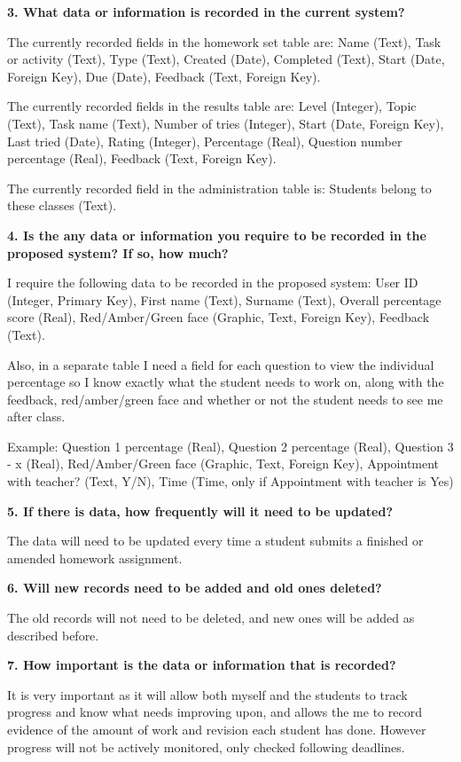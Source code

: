\textbf{3. What data or information is recorded in the current system?}

The currently recorded fields in the homework set table are: Name (Text), Task or activity (Text), Type (Text), Created (Date), Completed (Text), Start (Date, Foreign Key), Due (Date), Feedback (Text, Foreign Key).

The currently recorded fields in the results table are: Level (Integer), Topic (Text), Task name (Text), Number of tries (Integer), Start (Date, Foreign Key), Last tried (Date), Rating (Integer), Percentage (Real), Question number percentage (Real), Feedback (Text, Foreign Key).

The currently recorded field in the administration table is: Students belong to these classes (Text).

\textbf{4. Is the any data or information you require to be recorded in the proposed system? If so, how much?}

I require the following data to be recorded in the proposed system: User ID (Integer, Primary Key), First name (Text), Surname (Text), Overall percentage score (Real), Red/Amber/Green face (Graphic, Text, Foreign Key), Feedback (Text).

Also, in a separate table I need a field for each question to view the individual percentage so I know exactly what the student needs to work on, along with the feedback, red/amber/green face and whether or not the student needs to see me after class. 

Example: Question 1 percentage (Real), Question 2 percentage (Real), Question 3 - x (Real), Red/Amber/Green face (Graphic, Text, Foreign Key), Appointment with teacher? (Text, Y/N), Time (Time, only if Appointment with teacher is Yes)

\textbf{5. If there is data, how frequently will it need to be updated?}

The data will need to be updated every time a student submits a finished or amended homework assignment.

\textbf{6. Will new records need to be added and old ones deleted?}

The old records will not need to be deleted, and new ones will be added as described before.

\textbf{7. How important is the data or information that is recorded?}

It is very important as it will allow both myself and the students to track progress and know what needs improving upon, and allows the me to record evidence of the amount of work and revision each student has done. However progress will not be actively monitored, only checked following deadlines.

